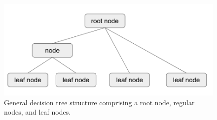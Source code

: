 \documentclass[a4paper, 11pt]{article}
\begin{document}
\begin{figure}
    \centering
    \includegraphics[width = 0.6 \linewidth]{thesis/figure/tree_structure.png}
    \caption{General decision tree structure comprising a root node, regular nodes, and leaf nodes.}
    \label{fig:tree_structure}
\end{figure}








    
\end{document}
